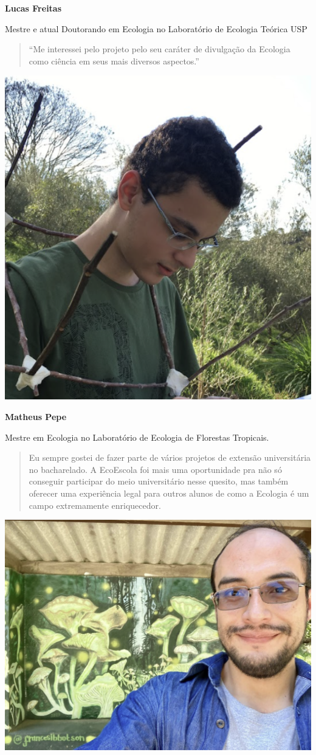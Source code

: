 \documentclass[
]{book}
\begin{document}
\textbf{Lucas Freitas}

Mestre e atual Doutorando em Ecologia no Laboratório de Ecologia Teórica USP

\begin{quote}
``Me interessei pelo projeto pelo seu caráter de divulgação da Ecologia como ciência em seus mais diversos aspectos.''
\end{quote}

\begin{center}\includegraphics[width=0.5\linewidth]{figs/pepe_picture} \end{center}

\textbf{Matheus Pepe}

Mestre em Ecologia no Laboratório de Ecologia de Florestas Tropicais.

\begin{quote}
Eu sempre gostei de fazer parte de vários projetos de extensão universitária no bacharelado. A EcoEscola foi mais uma oportunidade pra não só conseguir participar do meio universitário nesse quesito, mas também oferecer uma experiência legal para outros alunos de como a Ecologia é um campo extremamente enriquecedor.
\end{quote}

\begin{center}\includegraphics[width=0.5\linewidth]{figs/andres_picture} \end{center}
\end{document}
